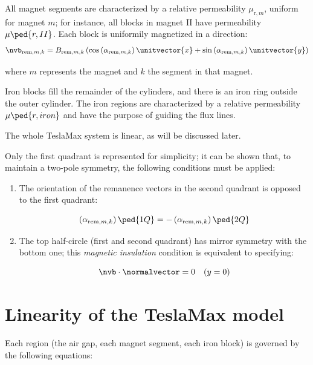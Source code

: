 \documentclass[article,brazil,english]{techreport}
\newcommand{\teslamax}{TeslaMax{ }}
\newcommand{\murm}{\mu_{\mathrm{r},m}}
\newcommand{\indexremmk}[2]{\mathrm{rem},{#1},{#2}}
\newcommand{\nvbremmk}[2]{\nvb_{\indexremmk{#1}{#2}}}
\newcommand{\bremmk}[2]{B_{\indexremmk{#1}{#2}}}
\newcommand{\alpharemmk}[2]{\alpha_{\indexremmk{#1}{#2}}}
\begin{document}
All magnet segments are characterized by a relative permeability $\murm$, uniform for magnet $m$; for instance, all blocks in magnet II have permeability $\mu\ped{r,II}$. Each block is uniformily magnetized in a direction:
\begin{equation}
  \label{eq:1}
\nvbremmk{m}{k} = \bremmk{m}{k} \left( \cos\left( \alpharemmk{m}{k}  \right) \unitvector{x} + \sin\left( \alpharemmk{m}{k}  \right) \unitvector{y} \right)
\end{equation}

\noindent where $m$ represents the magnet and $k$ the segment in that magnet.


Iron blocks fill the remainder of the cylinders, and there is an iron ring outside the outer cylinder. The iron regions are characterized by a relative permeability $\mu\ped{r,iron}$ and have the purpose of guiding the flux lines.

The whole \teslamax system is linear, as will be discussed later.

Only the first quadrant is represented for simplicity; it can be shown that, to maintain a two-pole symmetry, the following conditions must be applied:

\begin{enumerate}
\item The orientation of the remanence vectors in the second quadrant is opposed to the first quadrant:

  \begin{equation}
    \label{eq:2}
    \left( \alpharemmk{m}{k}  \right)\ped{1Q} = -\left( \alpharemmk{m}{k}  \right)\ped{2Q}
  \end{equation}
\item The top half-circle (first and second quadrant) has mirror symmetry with the bottom one; this \emph{magnetic insulation} condition is equivalent to specifying:

  \begin{equation}
    \label{eq:3}
    \nvb \cdot \normalvector = 0 \quad (y = 0)
  \end{equation}
\end{enumerate}

\section{Linearity of the \teslamax model}
\label{sec:line-tesl-model}

Each region (the air gap, each magnet segment, each iron block) is governed by the following equations:
\end{document}
